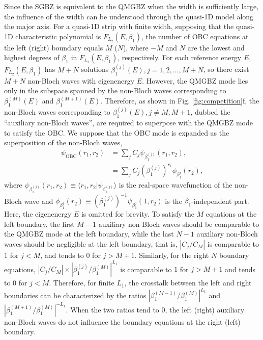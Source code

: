 \documentclass[pdflatex,sn-nature, iicol]{sn-jnl}%
\theoremstyle{thmstyleone}%
\theoremstyle{thmstyletwo}%
\theoremstyle{thmstylethree}%
\begin{document}
Since the SGBZ is equivalent to the QMGBZ when the width is sufficiently
large, the influence of the width can be understood through the quasi-1D
model along the major axis. For a quasi-1D strip with finite width,
supposing that the quasi-1D characteristic polynomial is $F_{L_{2}}(E,\beta_{1})$,
the number of OBC equations at the left (right) boundary equals $M$
($N$), where $-M$ and $N$ are the lowest and highest degrees of
$\beta_{1}$ in $F_{L_{2}}(E,\beta_{1})$, respectively. For each
reference energy $E$, $F_{L_{2}}(E,\beta_{1})$ has $M+N$ solutions
$\beta_{1}^{(j)}(E),j=1,2,\dots,M+N$, so there exist $M+N$ non-Bloch
waves with eigenenergy $E$. However, the QMGBZ mode lies only in
the subspace spanned by the non-Bloch waves corresponding to $\beta_{1}^{(M)}(E)$
and $\beta_{1}^{(M+1)}(E)$. Therefore, as shown in Fig. \ref{fig:competition}f,
the non-Bloch waves corresponding to $\beta_{1}^{(j)}(E),j\neq M,M+1$,
dubbed the ``auxiliary non-Bloch waves'', are required to superpose
with the QMGBZ mode to satisfy the OBC. We suppose that the OBC mode
is expanded as the superposition of the non-Bloch waves, 
\begin{align}
\psi_{\text{OBC}}\left(r_{1},r_{2}\right) & =\sum_{j}C_{j}\psi_{\beta_{1}^{(j)}}\left(r_{1},r_{2}\right),\nonumber \\
 & =\sum_{j}C_{j}\left(\beta_{1}^{(j)}\right)^{r_{1}}\phi_{\beta_{1}^{j}}\left(r_{2}\right),
\end{align}
where $\psi_{\beta_{1}^{(j)}}(r_{1},r_{2})\equiv\langle r_{1},r_{2}|\psi_{\beta_{1}^{(j)}}\rangle$
is the real-space wavefunction of the non-Bloch wave and $\phi_{\beta_{1}^{j}}(r_{2})\equiv(\beta_{1}^{(j)})^{-1}\psi_{\beta_{1}^{j}}(1,r_{2})$
is the $\beta_{1}$-independent part. Here, the eigenenergy $E$ is
omitted for brevity. To satisfy the $M$ equations at the left boundary,
the first $M-1$ auxiliary non-Bloch waves should be comparable to
the QMGBZ mode at the left boundary, while the last $N-1$ auxiliary
non-Bloch waves should be negligible at the left boundary, that is,
$|C_{j}/C_{M}|$ is comparable to $1$ for $j<M$, and tends to $0$
for $j>M+1$. Similarly, for the right $N$ boundary equations, $|C_{j}/C_{M}|\times|\beta_{1}^{(j)}/\beta_{1}^{(M)}|^{L_{1}}$
is comparable to $1$ for $j>M+1$ and tends to $0$ for $j<M$. Therefore,
for finite $L_{1}$, the crosstalk between the left and right boundaries
can be characterized by the ratios $|\beta_{1}^{(M-1)}/\beta_{1}^{(M)}|^{L_{1}}$
and $|\beta_{1}^{(M+1)}/\beta_{1}^{(M)}|^{-L_{1}}$. When the two
ratios tend to $0$, the left (right) auxiliary non-Bloch waves do
not influence the boundary equations at the right (left) boundary.
\end{document}
